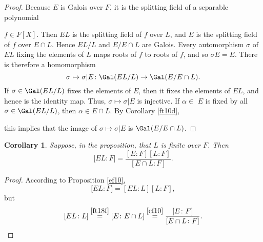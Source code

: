 \documentclass[a4paper,11pt,final,openany]{memoir}
\newtheorem{corollary}[X]{Corollary}
\theoremstyle{nonumberplain}
\newtheorem{proof}{Proof.}
\begin{document}
\begin{proof}
Because $E$ is Galois over $F$, it is the splitting field of a separable polynomial

\noindent\begin{minipage}[t]{4.5in}
$f\in F[X]$. Then $EL$ is the splitting field of $f$ over
$L$, and $E$ is the splitting field of $f$ over $E\cap L$. Hence $EL/L$ and
$E/E\cap L$ are Galois.
Every automorphism $\sigma$ of $EL$ fixing the elements of $L$ maps roots of $f$
to roots of $f$, and so $\sigma E=E$. There is therefore a homomorphism%
\[
\sigma\mapsto\sigma|E\colon\Gal(EL/L)\rightarrow\Gal(E/E\cap L)\text{.}%
\]
If $\sigma\in\Gal(EL/L)$ fixes the elements of $E$, then it fixes the elements
of $EL$, and hence is the identity map. Thus, $\sigma\mapsto\sigma|E$ is injective.
If $\alpha\in$ $E$ is fixed by all $\sigma\in\Gal(EL/L)$, then $\alpha\in
E\cap L$. By Corollary \ref{ft10d},
\end{minipage}
\begin{minipage}[t]{1.5in}
\end{minipage}


\noindent this implies that the image of $\sigma\mapsto\sigma|E$ is
$\Gal(E/E\cap L)$.
\end{proof}

\begin{corollary}
\label{ft18g}Suppose, in the proposition, that $L$ is finite over $F$. Then%
\[
\lbrack EL\colon F]=\frac{[E\colon F][L\colon F]}{[E\cap L\colon F]}\text{.}%
\]

\end{corollary}

\begin{proof}
According to Proposition \ref{ef10},%
\[
\lbrack EL\colon F]=[EL\colon L][L\colon F],
\]
but%
\[
\lbrack EL\colon L]\overset{\ref{ft18f}}{=}[E\colon E\cap
L]\overset{\ref{ef10}}{=}\frac{[E\colon F]}{[E\cap L\colon F]}\text{.}%
\]

\end{proof}
\end{document}
